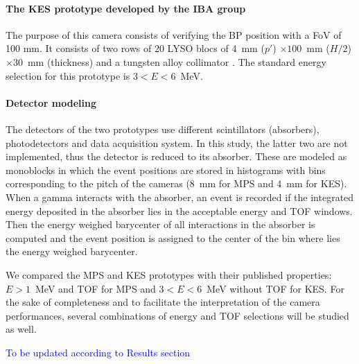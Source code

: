 \documentclass[a4paper,english,12pt]{article}
\newcommand{\et}[2][blue]{\textcolor{#1}{#2}}
\begin{document}
\paragraph{The KES prototype developed by the IBA group}

The purpose of this camera consists of verifying the BP position with a FoV of 100 mm. It consists of two rows of 20 LYSO blocs of 4~mm ($p'$) $\times 100$~mm ($H/2$) $\times30$~mm (thickness) and a tungsten alloy collimator \citep{Perali2014,Sterpin2015}. The standard energy selection for this prototype is $3<E<6$~MeV.

\paragraph{Detector modeling}

The detectors of the two prototypes use different scintillators (absorbers), photodetectors and data acquisition system. In this study, the latter two are not implemented, thus the detector is reduced to its absorber. These are modeled as monoblocks in which the event positions are stored in histograms with bins corresponding to the pitch of the cameras (8~mm for MPS and 4~mm for KES). When a gamma interacts with the absorber, an event is recorded if the integrated energy deposited in the absorber lies in the acceptable energy and TOF windows. Then the energy weighed barycenter of all interactions in the absorber is computed and the event position is assigned to the center of the bin where lies the energy weighed barycenter.

We compared the MPS and KES prototypes with their published properties: $E>1$~MeV and TOF for MPS and $3<E<6$~MeV without TOF for KES. For the sake of completeness and to facilitate the interpretation of the camera performances, several combinations of energy and TOF selections will be studied as well. 

\et{To be updated according to Results section}
\end{document}
